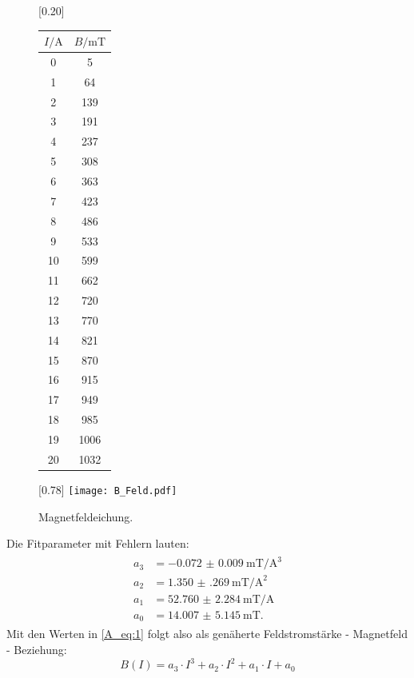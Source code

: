 \begin{figure}[p]
  \centering
  [0.20\textwidth]{
  \centering
  \begin{tabular}{c c}
    \toprule
    $I / \si{\ampere}$ & $B / \si{\milli\tesla}$ \\
    \midrule
    0 & 5 \\
    1 & 64 \\
    2 & 139 \\
    3 & 191 \\
    4 & 237 \\
    5 & 308 \\
    6 & 363 \\
    7 & 423 \\
    8 & 486 \\
    9 & 533 \\
    10 & 599 \\
    11 & 662 \\
    12 & 720 \\
    13 & 770 \\
    14 & 821 \\
    15 & 870 \\
    16 & 915 \\
    17 & 949 \\
    18 & 985 \\
    19 & 1006 \\
    20 & 1032 \\
    \bottomrule
  \end{tabular}
  }
  [0.78\textwidth]{
  \centering
  \texttt{[image: B\_Feld.pdf]}
  }
  \caption{Magnetfeldeichung.}
  \label{A_Abb:1}
\end{figure}

Die Fitparameter mit Fehlern lauten:
\begin{align}
\begin{split}
  a_3 &= \SI{-0.072(9)}{\milli\tesla\per\cubic\ampere}\\
  a_2 &= \SI{1.350(269)}{\milli\tesla\per\square\ampere}\\
  a_1 &= \SI{52.760(2284)}{\milli\tesla\per\ampere}\\
  a_0 &= \SI{14.007(5145)}{\milli\tesla}.
  \label{A_eq:1}
\end{split}
\end{align}
Mit den Werten in \eqref{A_eq:1} folgt also als genäherte Feldstromstärke - Magnetfeld
- Beziehung:
\begin{equation}
  B(I) = a_3 \cdot I^3 + a_2 \cdot I^2 + a_1 \cdot I + a_0
\end{equation}


